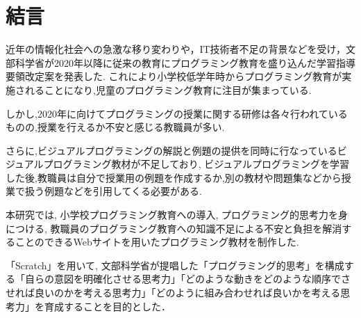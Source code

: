 \newpage

\section{\rm 結言}

近年の情報化社会への急激な移り変わりや，IT技術者不足の背景などを受け，文部科学省が2020年以降に従来の教育にプログラミング教育を盛り込んだ学習指導要領改定案を発表した.
これにより小学校低学年時からプログラミング教育が実施されることになり,児童のプログラミング教育に注目が集まっている.

しかし,2020年に向けてプログラミングの授業に関する研修は各々行われているものの,授業を行えるか不安と感じる教職員が多い.


さらに,ビジュアルプログラミングの解説と例題の提供を同時に行なっているビジュアルプログラミング教材が不足しており,
ビジュアルプログラミングを学習した後,教職員は自分で授業用の例題を作成するか,別の教材や問題集などから授業で扱う例題などを引用してくる必要がある.


本研究では, 小学校プログラミング教育への導入, プログラミング的思考力を身につける, 教職員のプログラミング教育への知識不足による不安と負担を解消することのできるWebサイトを用いたプログラミング教材を制作した.

「Scratch」を用いて, 文部科学省が提唱した「プログラミング的思考」を構成する「自らの意図を明確化させる思考力」「どのような動きをどのような順序でさせれば良いのかを考える思考力」「どのように組み合わせれば良いかを考える思考力」を育成することを目的とした．
